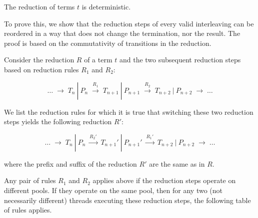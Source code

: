 \documentclass[runningheads,a4paper]{llncs}
\begin{document}

\begin{theorem}[Determinism]
The reduction of terms $t$ is deterministic.
\end{theorem}

To prove this, we show that the reduction steps of every valid
interleaving can be reordered in a way that does not change the
termination, nor the result.
The proof is based on the commutativity of transitions in the
reduction.

\begin{lemma}[Commutativity]\label{lemma-commutativity}
Consider the reduction $R$ of a term $t$ and the two subsequent reduction
steps based on reduction rules $R_1$ and $R_2$:

\begin{equation*}
\ldots \;\longrightarrow\; T_n~|~P_n \;\stackrel{R_1}{\longrightarrow}\; T_{n+1}~|~P_{n+1}
\;\stackrel{R_2}{\longrightarrow}\; T_{n+2}~|~P_{n+2}
\;\longrightarrow\; \ldots
\end{equation*}

We list the reduction rules for which it is true that switching these
two reduction steps yields the following reduction $R'$:

\begin{equation*}
\ldots \;\longrightarrow\; T_n~|~P_n \;\stackrel{R_2'}{\longrightarrow}\; T_{n+1}'~|~P_{n+1}'
\;\stackrel{R_1'}{\longrightarrow}\; T_{n+2}~|~P_{n+2}
\;\longrightarrow\; \ldots
\end{equation*}

where the prefix and suffix of the reduction $R'$ are the same as in $R$.

Any pair of rules $R_1$ and $R_2$ applies above if the reduction steps
operate on different pools.
If they operate on the same pool, then for any two (not necessarily
different) threads executing these reduction steps, the following
table of rules applies.


\end{lemma}
\end{document}
